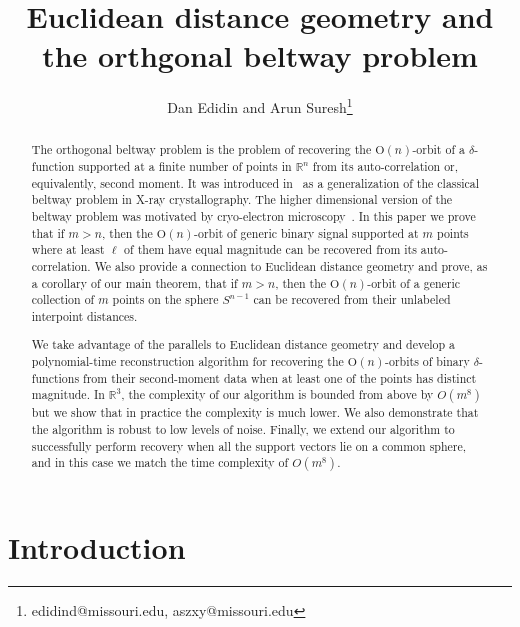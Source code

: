 \documentclass{article}
\title{Euclidean distance geometry and the orthgonal beltway problem}
\author{Dan Edidin and Arun Suresh\thanks{edidind@missouri.edu, aszxy@missouri.edu}}
\affil{Department of Mathematics, University of Missouri-Columbia, MO 65211}
\theoremstyle{definition}
\renewcommand{\r}{\mathbb{R}}
\renewcommand{\|}{|}
\renewcommand{\O}{\mathrm{O}}
\begin{document}
\maketitle
\begin{abstract}
The orthogonal beltway problem is the problem of recovering the $\O(n)$-orbit of a $\delta$-function supported
at a finite number of points in $\r^n$  from its auto-correlation or, equivalently, second moment. It 
was introduced in~\cite{bendory2024beltway}
as a generalization of the classical beltway problem in X-ray crystallography. The higher dimensional version of the beltway problem was motivated by cryo-electron microscopy~\cite{bendory2023autocorrelation}.
In this paper we prove that if $m > n$, then the $\O(n)$-orbit of generic binary signal supported at $m$ points where at least $\ell$ of them 
have equal magnitude can be recovered from its auto-correlation. We also provide a connection to Euclidean distance
geometry and prove, as a corollary of our main theorem, that if $m > n$, then the $\O(n)$-orbit of a generic collection of $m$ points
on the sphere $S^{n-1}$ can be recovered from their unlabeled interpoint distances.

We take advantage of the parallels to Euclidean distance geometry and develop a polynomial-time reconstruction algorithm for recovering the $\O(n)$-orbits of binary $\delta$-functions
from their second-moment data when at least one of the points has distinct magnitude. In $\mathbb{R}^3$, the complexity of our algorithm is bounded from above by $O(m^8)$ but we show that in practice the complexity is much lower. We also demonstrate that the algorithm is robust to low levels of noise.
Finally, we extend our algorithm to successfully perform recovery when all
the support vectors lie on a common sphere, and in this case we match the time complexity of $O(m^8)$.
\end{abstract}

\section{Introduction}
\end{document}
